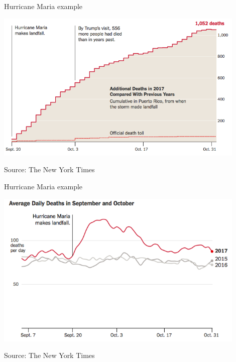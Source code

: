 \documentclass[ignorenonframetext,]{beamer}
\begin{document}
\begin{frame}{Hurricane Maria example}

\begin{center}\includegraphics[width=0.9\textwidth]{maria_excess_deaths} \end{center}

\vspace{-0.2cm}

\footnotesize

Source: The New York Times

\end{frame}

\begin{frame}{Hurricane Maria example}

\begin{center}\includegraphics[width=0.9\textwidth]{maria_timeseries} \end{center}

\vspace{-0.2cm}

\footnotesize

Source: The New York Times

\end{frame}
\end{document}

